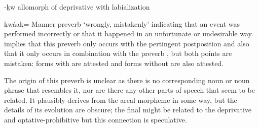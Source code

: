\begin{morphdesc}[resume*=alphalist]
\item[-ḵw]\label{m:-ḵw-dprv}
	allomorph of deprivative  with labialization

\item[ḵwáaḵ=]\label{m:ḵwáaḵ=}
	Manner preverb ‘wrongly, mistakenly’ indicating that an event was performed incorrectly
		or that it happened in an unfortunate or undesirable way.
	\textcite[134, 297]{leer:1991} implies that this preverb
		only occurs with the pertingent postposition 
		and also that it only occurs in combination with the preverb ,
		but both points are mistaken: forms with  are attested
		and forms without  are also attested.
	
	The origin of this preverb is unclear as there is no corresponding noun or noun phrase
		that resembles it, nor are there any other parts of speech that seem to be related.
	It plausibly derives from the areal morpheme  in some way, but
		the details of its evolution are obscure; the final  might be related to
		the deprivative  and optative-prohibitive 
		but this connection is speculative.
	

\end{morphdesc}
